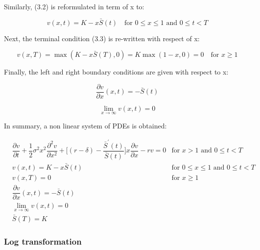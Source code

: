 Similarly, (3.2) is reformulated in term of x to:

\begin{equation}
    v(x, t) = K - x\bar{S}(t) \quad  \text{for $0 \le x \le 1$ and $0 \le t < T$}
\end{equation}

Next, the terminal condition (3.3) is re-written with respect of x:

\begin{equation}
    v(x, T) = \max(K - x\bar{S}(T), 0) = K \max(1 - x, 0) = 0 \quad \text{for $x \ge 1$}
\end{equation}

Finally, the left and right boundary conditions are given with respect to x:

\begin{equation}
    \dfrac{\partial{v}}{\partial{x}}(x, t) = -\bar{S}(t)
\end{equation}

\begin{equation}
    \lim_{x \rightarrow \infty} v(x, t) = 0
\end{equation}

In summary, a non linear system of PDEs is obtained:

\begin{align}
    & \dfrac{\partial{v}}{\partial{t}} + \dfrac{1}{2}\sigma^{2} x^2 \dfrac{\partial^2{v}}{\partial{x}^2} + \bigg[(r - \delta) - \dfrac{\bar{S}^\prime(t)}{\bar{S}(t)}\bigg]x\dfrac{\partial{v}}{\partial{x}} - rv = 0 & \text{for $x > 1$ and $0 \le t < T$} \\
    & v(x, t) = K - x\bar{S}(t) & \text{for $0 \le x \le 1$ and $0 \le t < T$} \\
    & v(x, T) = 0 & \text{for $x \ge 1$} \\
    & \dfrac{\partial{v}}{\partial{x}}(x, t) = -\bar{S}(t) & \\
    & \lim_{x \rightarrow \infty} v(x, t) = 0 & \\
    & \bar{S}(T) = K & 
\end{align}


\subsubsection{Log transformation}
